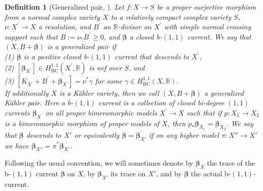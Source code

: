\documentclass[12pt]{amsart}
\numberwithin{equation}{section}
\theoremstyle{definition}
\theoremstyle{plain}
\newtheorem{definition}  [theorem]     {Definition}
\newtheorem*{thm A*}{Theorem A}
\newtheorem*{thm B*}{Theorem B}
\newtheorem*{thm C*}{Theorem C}
\newtheorem*{thm D*}{Theorem D}
\theoremstyle{definition}
\renewcommand{\1}{\mathds{1}}
\newcommand{\bbeta}{\boldsymbol{\beta}}
\renewcommand{\>}{\rightarrow}
\begin{document}
\begin{definition}[{Generalized pair, \cite[Definition 2.7]{DHY23}}]
Let $f: X \rightarrow S$ be a proper surjective morphism from a normal complex variety $X$ to a relatively compact complex variety $S$, $\nu: X^{\prime} \rightarrow X$ a resolution, and  $B^{\prime}$ an $\mathbb{R}$-divisor on $X^{\prime}$ with simple normal crossing support such that $B:=\nu_* B^{\prime} \ge 0$, and $ \boldsymbol{\beta}$ a closed b-$(1,1)$ current. We say that $(X, B+ { \boldsymbol{ \beta}})$ is a \emph{generalized pair} if\\
\emph{(1)} $ { \boldsymbol{\beta}}$ is a positive closed b-$(1,1)$ current that descends to $X^{\prime}$,\\
\emph{(2)} $\left[ { \boldsymbol{\beta}}_{X^{\prime}}\right] \in H_{\mathrm{BC}}^{1,1}\left(X^{\prime},\mathbb{R}\right)$ is nef over $S$, and\\
\emph{(3)} $\left[K_{X^{\prime}}+B^{\prime}+ { \boldsymbol{\beta}}_{X^{\prime}}\right]=\nu^* \gamma$ for some $\gamma \in H_{\mathrm{BC}}^{1,1}(X,\mathbb{R})$.\\
If additionally $X$ is a K\"ahler variety, then we call $(X, B + \boldsymbol{\beta})$ a \emph{generalized K\"ahler pair}. Here a \emph{b-$(1,1)$ current} is a collection of closed bi-degree $(1,1)$ currents $\boldsymbol{\beta}_{X^{\prime}}$ on all proper bimeromorphic models $X^{\prime} \rightarrow X$ such that if $p: X_1 \rightarrow X_2$ is a bimeromorphic morphism of proper models of $X$, then $p_* \boldsymbol{\beta}_{X_1}=\boldsymbol{\beta}_{X_2}$. We say that $\bbeta$ \emph{descends to $X'$} or equivalently $\bbeta =\overline { \bbeta _{X'}}$ if on any higher model $\pi:X''\to X'$ we have $\bbeta_{X''}=\pi^* \bbeta_{X'}$. 
\end{definition}
Following the usual convention, we will sometimes denote by $\boldsymbol{\beta}_X$ the trace of the b-$(1,1)$ current $\boldsymbol{\beta}$ on $X$, by $\boldsymbol{\beta}_{X'}$ its trace on $X'$, and by $\boldsymbol{\beta}$ the actual b-$(1,1)$-current.
\end{document}
